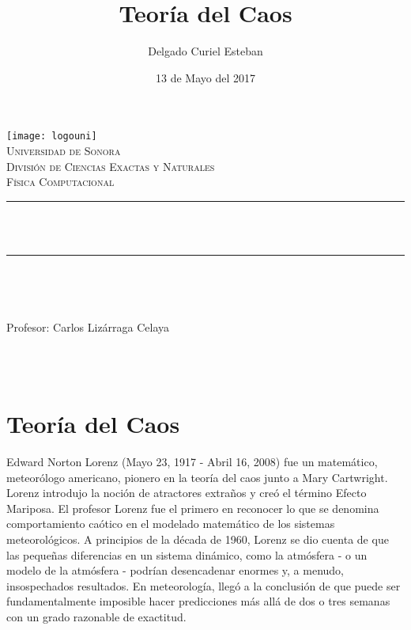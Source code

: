 \documentclass[12pt]{article}
\title{Teoría del Caos}  %
\author{\centering Delgado Curiel Esteban}											%
\date{13 de Mayo del 2017} %
\makeatletter
\let\thetitle\@title
\let\theauthor\@author
\let\thedate\@date
\makeatother
\begin{document}

\begin{titlepage}
	\begin{centering}
    
    \vspace*{0.5 cm}
    \texttt{[image: logouni]}\\[0.5 cm]	%
    \textsc{\Large Universidad de Sonora}\\[1.0 cm]	%
	\textsc{\Large División de Ciencias Exactas y Naturales}\\[0.5 cm]				%
	\textsc{\large Física Computacional}\\[0.5 cm]				%
	\rule{\linewidth}{0.2 mm} \\[0.4 cm]
	{ \huge \bfseries \thetitle}\\
	\rule{\linewidth}{0.2 mm} \\[0.5 cm]
	
	\begin{minipage}{\textwidth}
		\begin{flushleft} 
			\emph{\Large} \large \\
			\theauthor
			\end{flushleft}
	
		\begin{flushleft} 
			{Profesor:} \large \centering Carlos Lizárraga Celaya	
			\end{flushleft}
	\end{minipage}\\[1 cm]
	{\large \thedate}\\[2 cm]
 
	\vfill
    \end{centering}
    \end{titlepage}
    
\section*{Teoría del Caos}

Edward Norton Lorenz (Mayo 23, 1917 - Abril 16, 2008) fue un matemático, meteorólogo americano, pionero en la teoría del caos junto a Mary Cartwright. Lorenz introdujo la noción de atractores extraños y creó el término Efecto Mariposa. El profesor Lorenz fue el primero en reconocer lo que se denomina comportamiento caótico en el modelado matemático de los sistemas meteorológicos. A principios de la década de 1960, Lorenz se dio cuenta de que las pequeñas diferencias en un sistema dinámico, como la atmósfera - o un modelo de la atmósfera - podrían desencadenar enormes y, a menudo, insospechados resultados. En meteorología, llegó a la conclusión de que puede ser fundamentalmente imposible hacer predicciones más allá de dos o tres semanas con un grado razonable de exactitud.\\
\end{document}
